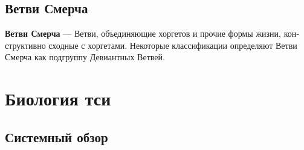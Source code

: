 \documentclass[a4paper,12pt,fleqn]{book}\usepackage{polyglossia}\setdefaultlanguage[babelshorthands=true]{russian}\setotherlanguage{english}\defaultfontfeatures{Ligatures=TeX,Mapping=tex-text}\usepackage{xcolor}\newcommand{\ml}[3]{#2}
\newcommand{\theterm}[3]{\textbf{\hypertarget{#1}{#2}} --- #3}
\begin{document}
\section{Ветви Смерча}

\theterm{jorget} %
{Ветви Смерча}
{Ветви, объединяющие хоргетов и прочие формы жизни, конструктивно сходные с хоргетами.
Некоторые классификации определяют Ветви Смерча как подгруппу Девиантных Ветвей.}

\chapter{Биология тси}

\section{Системный обзор}
\end{document}
